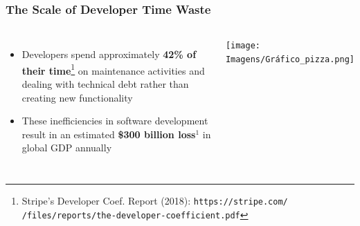 \documentclass{beamer}
\begin{document}

\begin{frame}
\frametitle{The Scale of Developer Time Waste}

\begin{columns}[T]
\begin{itemize}
\item Developers spend approximately \textbf{42\% of their time}\footnote{\tiny Stripe's Developer Coef. Report (2018): \texttt{https://stripe.com/} \texttt{/files/reports/the-developer-coefficient.pdf}} on maintenance activities and dealing with technical debt rather than creating new functionality
\item These inefficiencies in software development result in an estimated \textbf{\$300 billion loss}$^{1}$ in global GDP annually
\end{itemize}

\begin{center}
\texttt{[image: Imagens/Gráfico\_pizza.png]}
\end{center}
\end{columns}

\end{frame}
\end{document}
